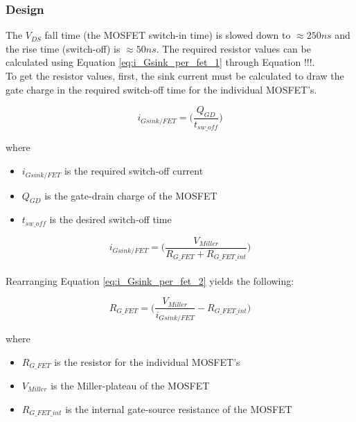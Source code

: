 \subsubsection{Design}
\label{sec:DriverDesign}

The $V_{DS}$ fall time (the MOSFET switch-in time) is slowed down to $\approx 250ns$ and the rise time (switch-off) is $\approx 50ns$. The required resistor values can be calculated using Equation \ref{eq:i_Gsink_per_fet_1} through Equation !!!. \\

To get the resistor values, first, the sink current must be calculated to draw the gate charge in the required switch-off time for the individual MOSFET's. 

    \begin{equation}
        i_{Gsink/FET} = \bigg( \frac{Q_{GD}}{t_{sw{\_}off}} \bigg)
        \label{eq:i_Gsink_per_fet_1}
    \end{equation}
    
    where
    
    \begin{itemize}
        \item $i_{Gsink/FET}$ is the required switch-off current
        \item $Q_{GD}$ is the gate-drain charge of the MOSFET
        \item $t_{sw{\_}off}$ is the desired switch-off time
    \end{itemize}
    
    \begin{equation}
        i_{Gsink/FET} = \bigg( \frac{V_{Miller}}{R_{G{\_}FET} + R_{G{\_}FET{\_}int}} \bigg)
        \label{eq:i_Gsink_per_fet_2}
    \end{equation} \\
    
    Rearranging Equation \ref{eq:i_Gsink_per_fet_2} yields the following:
    
    \begin{equation}
        R_{G{\_}FET} = \bigg( \frac{V_{Miller}}{i_{Gsink/FET}} - R_{G{\_}FET{\_}int} \bigg)
        \label{eq:i_Gsink_per_fet_2}
    \end{equation}
    
    where
    
    \begin{itemize}
        \item $R_{G{\_}FET}$ is the resistor for the individual MOSFET's
        \item $V_{Miller}$ is the Miller-plateau of the MOSFET
        \item $R_{G{\_}FET{\_}int}$ is the internal gate-source resistance of the MOSFET
    \end{itemize}
    
